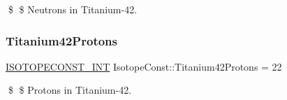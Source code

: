 \$ \$ Neutrons in Titanium-\/42. \mbox{\label{group___isotope_const-_titanium-_ti42_gad2460c31ad63e87554f0a25dd921e403}} 
\subsubsection{\texorpdfstring{Titanium42\+Protons}{Titanium42Protons}}
{\footnotesize\ttfamily \mbox{\hyperlink{group___isotope_const-_macros_ga5f18360b3e99483a35c32d789e62621c}{I\+S\+O\+T\+O\+P\+E\+C\+O\+N\+S\+T\+\_\+\+I\+NT}} Isotope\+Const\+::\+Titanium42\+Protons = 22}

\$ \$ Protons in Titanium-\/42. 